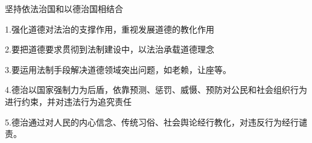 \documentclass[lang=cn,10pt]{elegantbook}
\begin{document}
	\begin{example}
		坚持依法治国和以德治国相结合
	\end{example}
	\begin{solution}
		
		1.强化道德对法治的支撑作用，重视发展道德的教化作用
		
		2.要把道德要求贯彻到法制建设中，以法治承载道德理念
		
		3.要运用法制手段解决道德领域突出问题，如老赖，让座等。
		
		4.德治以国家强制力为后盾，依靠预测、惩罚、威慑、预防对公民和社会组织行为进行约束，并对违法行为追究责任
		
		5.德治通过对人民的内心信念、传统习俗、社会舆论经行教化，对违反行为经行谴责。
	\end{solution}
\end{document}
